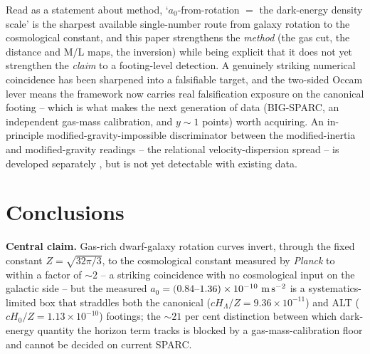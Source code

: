 \documentclass[fleqn,usenatbib]{mnras}
\begin{document}
Read as a statement about method, `$a_0$-from-rotation $=$ the dark-energy density scale' is the sharpest available single-number route from galaxy rotation to the cosmological constant, and this paper strengthens the \emph{method} (the gas cut, the distance and M/L maps, the inversion) while being explicit that it does not yet strengthen the \emph{claim} to a footing-level detection. A genuinely striking numerical coincidence has been sharpened into a falsifiable target, and the two-sided Occam lever means the framework now carries real falsification exposure on the canonical footing -- which is what makes the next generation of data (BIG-SPARC, an independent gas-mass calibration, and $y\sim1$ points) worth acquiring. An in-principle modified-gravity-impossible discriminator between the modified-inertia and modified-gravity readings -- the relational velocity-dispersion spread -- is developed separately \citep{Zimmerman2026c}, but is not yet detectable with existing data.


\section{Conclusions}
\label{sec:conclusions}

\textbf{Central claim.} Gas-rich dwarf-galaxy rotation curves invert, through the fixed constant $Z=\sqrt{32\pi/3}$, to the cosmological constant measured by \textit{Planck} to within a factor of ${\sim}2$ -- a striking coincidence with no cosmological input on the galactic side -- but the measured $a_0=(0.84$--$1.36)\times10^{-10}\ {\rm m\,s^{-2}}$ is a systematics-limited box that straddles both the canonical ($cH_\Lambda/Z=9.36\times10^{-11}$) and ALT ($cH_0/Z=1.13\times10^{-10}$) footings; the ${\sim}21$ per cent distinction between which dark-energy quantity the horizon term tracks is blocked by a gas-mass-calibration floor and cannot be decided on current SPARC.
\end{document}
